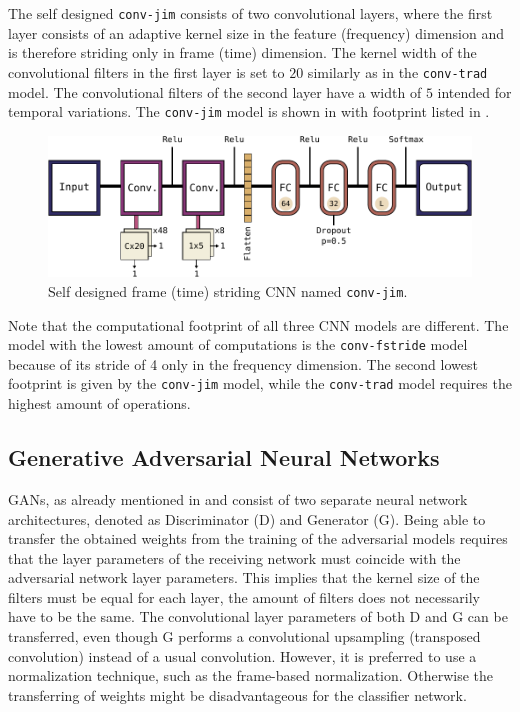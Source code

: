 The self designed \texttt{conv-jim} consists of two convolutional layers, where the first layer consists of an adaptive kernel size in the feature (frequency) dimension and is therefore striding only in frame (time) dimension.
The kernel width of the convolutional filters in the first layer is set to $20$ similarly as in the \texttt{conv-trad} model.
The convolutional filters of the second layer have a width of $5$ intended for temporal variations.
The \texttt{conv-jim} model is shown in  with footprint listed in .
\begin{figure}[!ht]
  \centering
    \includegraphics[height=0.2\textwidth]{./4_nn/figs/nn_arch_cnn_jim.pdf}
  \caption{Self designed frame (time) striding CNN named \texttt{conv-jim}.}
  \label{fig:nn_arch_cnn_jim}
\end{figure}
\FloatBarrier
\noindent


Note that the computational footprint of all three CNN models are different.
The model with the lowest amount of computations is the \texttt{conv-fstride} model because of its stride of 4 only in the frequency dimension.
The second lowest footprint is given by the \texttt{conv-jim} model, while the \texttt{conv-trad} model requires the highest amount of operations.



\subsection{Generative Adversarial Neural Networks}\label{sec:nn_arch_adv}
GANs, as already mentioned in  and  consist of two separate neural network architectures, denoted as Discriminator (D) and Generator (G).
Being able to transfer the obtained weights from the training of the adversarial models requires that the layer parameters of the receiving network must coincide with the adversarial network layer parameters.
This implies that the kernel size of the filters must be equal for each layer, the amount of filters does not necessarily have to be the same.
The convolutional layer parameters of both D and G can be transferred, even though G performs a convolutional upsampling (transposed convolution) instead of a usual convolution.
However, it is preferred to use a normalization technique, such as the frame-based normalization. 
Otherwise the transferring of weights might be disadvantageous for the classifier network.

